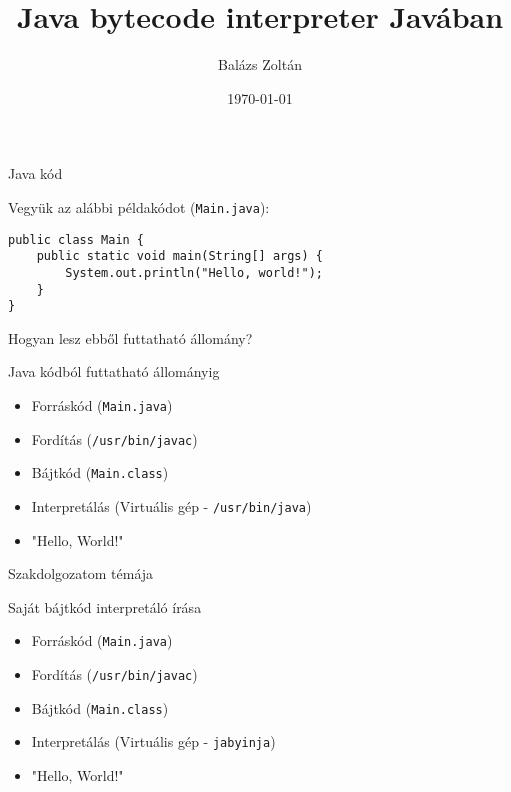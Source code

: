\documentclass[14pt, aspectratio=169]{beamer}
\title{Java bytecode interpreter Javában}
\institute{Eötvös Loránd Tudományegyetem}
\author{Balázs Zoltán}
\date{\today}
\begin{document}
\maketitle

\begin{frame}[fragile]{Java kód}

Vegyük az alábbi példakódot (\texttt{Main.java}):
\begin{verbatim}
public class Main {
    public static void main(String[] args) {
        System.out.println("Hello, world!");
    }
}
\end{verbatim}
Hogyan lesz ebből futtatható állomány?

\end{frame}

\begin{frame}[fragile]{Java kódból futtatható állományig}

\begin{itemize}
    \item<+-> Forráskód (\texttt{Main.java})
    \item<+-> Fordítás (\texttt{/usr/bin/javac})
    \item<+-> Bájtkód (\texttt{Main.class})
    \item<+-> Interpretálás (Virtuális gép - \texttt{/usr/bin/java})
    \item<+-> "Hello, World!"
\end{itemize}

\end{frame}

\begin{frame}{Szakdolgozatom témája}

Saját bájtkód interpretáló írása

\begin{itemize}
    \item<2-> Forráskód (\texttt{Main.java})
    \item<2-> Fordítás (\texttt{/usr/bin/javac})
    \item<2-> Bájtkód (\texttt{Main.class})
    \item<2-> Interpretálás (Virtuális gép - \alert{\texttt{jabyinja}})
    \item<2-> "Hello, World!"
\end{itemize}
    
\end{frame}
\end{document}
